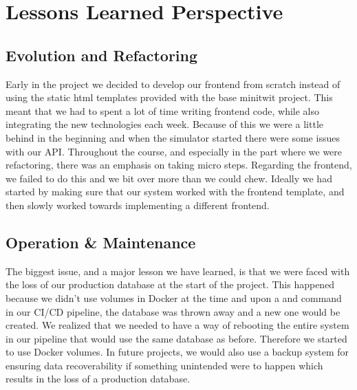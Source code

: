 \chapter{Lessons Learned Perspective}

\section{Evolution and Refactoring}

Early in the project we decided to develop our frontend from scratch instead of using the static html templates provided with the base minitwit project. This meant that we had to spent a lot of time writing frontend code, while also integrating the new technologies each week. Because of this we were a little behind in the beginning and when the simulator started there were some issues with our API. Throughout the course, and especially in the part where we were refactoring, there was an emphasis on taking micro steps. Regarding the frontend, we failed to do this and we bit over more than we could chew. Ideally we had started by making sure that our system worked with the frontend template, and then slowly worked towards implementing a different frontend.


\section{Operation \& Maintenance}

The biggest issue, and a major lesson we have learned, is that we were faced with the loss of our production database at the start of the project. This happened because we didn't use volumes in Docker at the time and upon a  and  command in our \gls{CI}/\gls{CD} pipeline, the database was thrown away and a new one would be created. We realized that we needed to have a way of rebooting the entire system in our pipeline that would use the same database as before. Therefore we started to use Docker volumes. In future projects, we would also use a backup system for ensuring data recoverability if something unintended were to happen which results in the loss of a production database.

